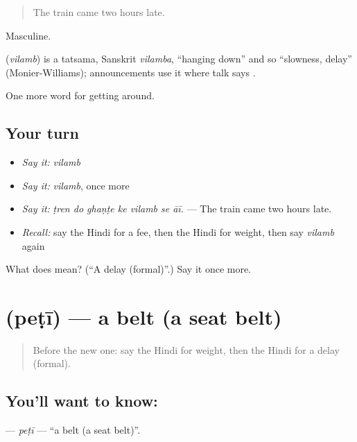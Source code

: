 \begin{quote}
The train came two hours late.
\end{quote}

Masculine.

\begin{cousinweb}
\textbf{} (\emph{vilamb}) is a tatsama, Sanskrit \emph{vilamba}, \textquotedblleft{}hanging down\textquotedblright{} and so \textquotedblleft{}slowness, delay\textquotedblright{} (Monier-Williams); announcements use it where talk says .
\end{cousinweb}

\begin{grammarlens}[title={What you've built}]
One more word for getting around.
\end{grammarlens}

\subsection*{Your turn}
\begin{itemize}
\raggedright
  \item \emph{Say it:} \emph{vilamb}
  \item \emph{Say it:} \emph{vilamb}, once more
  \item \emph{Say it:} \emph{ṭren do ghaṇṭe ke vilamb se āī.} — The train came two hours late.
  \item \emph{Recall:} say the Hindi for a fee, then the Hindi for weight, then say \emph{vilamb} again
\end{itemize}

\begin{tcolorbox}[breakable,colback=teal!4,colframe=teal!35!black,title={Before you move on}]
What does  mean? (\textquotedblleft{}A delay (formal)\textquotedblright{}.) Say it once more.
\end{tcolorbox}
\section[\texorpdfstring{\hi{पेटी} (peṭī)}{पेटी (peṭī)}]{ (peṭī) — a belt (a seat belt)}

\label{lesson:HI-C411-peti}



\begin{quote}
Before the new one: say the Hindi for weight, then the Hindi for a delay (formal).
\end{quote}

\subsection*{You'll want to know: }
\textbf{} — \emph{peṭī} — \textquotedblleft{}a belt (a seat belt)\textquotedblright{}.

